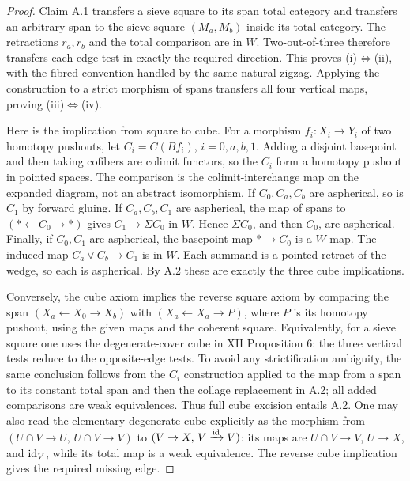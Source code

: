 \begin{proof}
Claim A.1 transfers a sieve square to its span total category and transfers an arbitrary span to the sieve square $(M_a,M_b)$ inside its total category. The retractions $r_a,r_b$ and the total comparison are in $W$. Two-out-of-three therefore transfers each edge test in exactly the required direction. This proves (i)$\Leftrightarrow$(ii), with the fibred convention handled by the same natural zigzag. Applying the construction to a strict morphism of spans transfers all four vertical maps, proving (iii)$\Leftrightarrow$(iv).

Here is the implication from square to cube. For a morphism $f_i:X_i\to Y_i$ of two homotopy pushouts, let $C_i=C(Bf_i)$, $i=0,a,b,1$. Adding a disjoint basepoint and then taking cofibers are colimit functors, so the $C_i$ form a homotopy pushout in pointed spaces. The comparison is the colimit-interchange map on the expanded diagram, not an abstract isomorphism. If $C_0,C_a,C_b$ are aspherical, so is $C_1$ by forward gluing. If $C_a,C_b,C_1$ are aspherical, the map of spans to $(*\leftarrow C_0\to*)$ gives $C_1\to\Sigma C_0$ in $W$. Hence $\Sigma C_0$, and then $C_0$, are aspherical. Finally, if $C_0,C_1$ are aspherical, the basepoint map $*\to C_0$ is a $W$-map. The induced map $C_a\vee C_b\to C_1$ is in $W$. Each summand is a pointed retract of the wedge, so each is aspherical. By A.2 these are exactly the three cube implications.

Conversely, the cube axiom implies the reverse square axiom by comparing the span $(X_a\leftarrow X_0\to X_b)$ with $(X_a\leftarrow X_a\to P)$, where $P$ is its homotopy pushout, using the given maps and the coherent square. Equivalently, for a sieve square one uses the degenerate-cover cube in XII Proposition 6: the three vertical tests reduce to the opposite-edge tests. To avoid any strictification ambiguity, the same conclusion follows from the $C_i$ construction applied to the map from a span to its constant total span and then the collage replacement in A.2; all added comparisons are weak equivalences. Thus full cube excision entails A.2. One may also read the elementary degenerate cube explicitly as the morphism from $(U\cap V\to U,\,U\cap V\to V)$ to $(V\to X,\,V\xrightarrow{\operatorname{id}}V)$: its maps are $U\cap V\to V$, $U\to X$, and $\operatorname{id}_V$, while its total map is a weak equivalence. The reverse cube implication gives the required missing edge.


\end{proof}
